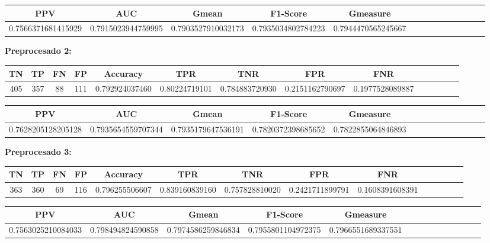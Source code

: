 \documentclass[a4]{article}
\begin{document}
\begin{center}
\begin{tabular}{|c|c|c|c|c|c|c|c|c|c|c|c|c|c|}
\hline
\multicolumn{1}{|c|}{\textbf{PPV}} & \textbf{AUC} & \textbf{Gmean} & \textbf{F1-Score} & \textbf{Gmeasure}  \\ \hline
  0.7566371681415929 & 0.7915023944759995 & 0.7903527910032173 & 0.7935034802784223 & 0.7944470565245667 \\ \hline
\end{tabular}
\end{center}

\textbf{Preprocesado 2:}
\begin{center}
\begin{tabular}{|c|c|c|c|c|c|c|c|c|c|c|c|c|c|}
\hline
\multicolumn{1}{|c|}{\textbf{TN}}& \textbf{TP} & \textbf{FN} & \textbf{FP} & \textbf{Accuracy} & \textbf{TPR} & \textbf{TNR} & \textbf{FPR} &\textbf{FNR} \\ \hline
  405 & 357 & 88 & 111 & 0.792924037460 & 0.80224719101 & 0.784883720930 & 0.2151162790697 & 0.1977528089887 \\ \hline
\end{tabular}
\end{center}

\begin{center}
\begin{tabular}{|c|c|c|c|c|c|c|c|c|c|c|c|c|c|}
\hline
\multicolumn{1}{|c|}{\textbf{PPV}} & \textbf{AUC} & \textbf{Gmean} & \textbf{F1-Score} & \textbf{Gmeasure}  \\ \hline
  0.7628205128205128 & 0.7935654559707344 & 0.7935179647536191 & 0.7820372398685652 & 0.7822855064846893 \\ \hline
\end{tabular}
\end{center}

\textbf{Preprocesado 3:}
\begin{center}
\begin{tabular}{|c|c|c|c|c|c|c|c|c|c|c|c|c|c|}
\hline
\multicolumn{1}{|c|}{\textbf{TN}}& \textbf{TP} & \textbf{FN} & \textbf{FP} & \textbf{Accuracy} & \textbf{TPR} & \textbf{TNR} & \textbf{FPR} &\textbf{FNR} \\ \hline
  363 & 360 & 69 & 116 & 0.796255506607 & 0.839160839160 & 0.757828810020 & 0.2421711899791 & 0.1608391608391 \\ \hline
\end{tabular}
\end{center}

\begin{center}
\begin{tabular}{|c|c|c|c|c|c|c|c|c|c|c|c|c|c|}
\hline
\multicolumn{1}{|c|}{\textbf{PPV}} & \textbf{AUC} & \textbf{Gmean} & \textbf{F1-Score} & \textbf{Gmeasure}  \\ \hline
  0.7563025210084033 & 0.798494824590858 & 0.7974586259846834 & 0.7955801104972375 & 0.7966551689337551 \\ \hline
\end{tabular}
\end{center}
\end{document}
